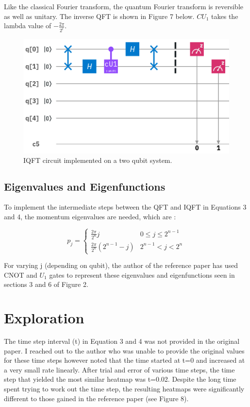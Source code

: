 \documentclass{article}
\begin{document}
\noindent Like the classical Fourier transform, the quantum Fourier transform is reversible as well as unitary. The inverse QFT is shown in Figure 7 below. $CU_1$ takes the lambda value of $-\frac{2\pi}{2^t}$.

\begin{figure}[!htb]
\includegraphics[scale=0.5]{../images/iqft}
  \centering
  \caption{IQFT circuit implemented on a two qubit system.}
\end{figure}

\subsection{Eigenvalues and Eigenfunctions}
To implement the intermediate steps between the QFT and IQFT in Equations 3 and 4, the momentum eigenvalues are needed, which are \cite{manik}:

\[p_{j}=\left\{\begin{array}{ll}{\frac{2 \pi}{2^{n}} j} & {0 \leqslant j \leqslant 2^{n-1}} \\ {\frac{2 \pi}{2^{n}}\left(2^{n-1}-j\right)} & {2^{n-1}<j<2^{n}}\end{array}\right.\]

For varying j (depending on qubit), the author of the reference paper has used CNOT and $U_1$ gates to represent these eigenvalues and eigenfunctions seen in sections 3 and 6 of Figure 2.

\section{Exploration}
The time step interval (t) in Equation 3 and 4 was not provided in the original paper. I reached out to the author who was unable to provide the original values for these time steps however noted that the time started at t=0 and increased at a very small rate linearly. After trial and error of various time steps, the time step that yielded the most similar heatmap was t=0.02. Despite the long time spent trying to work out the time step, the resulting heatmaps were significantly different to those gained in the reference paper (see Figure 8).
\end{document}
